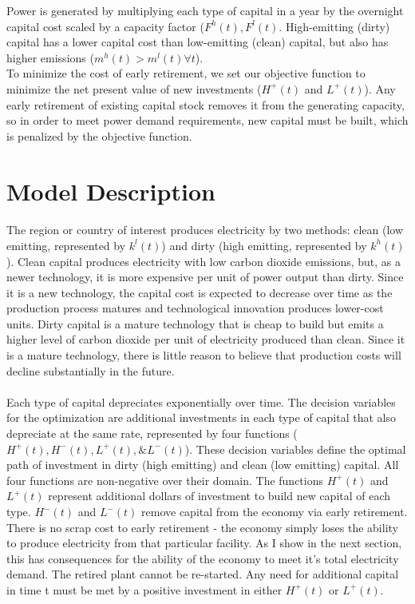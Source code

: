 \documentclass[singlespace]{easychithesis}
\begin{document}
Power is generated by multiplying each type of capital in a year by the overnight capital cost scaled by a capacity factor ($F^h(t), F^l(t)$. High-emitting (dirty) capital has a lower capital cost than low-emitting (clean) capital, but also has higher emissions ($m^h(t) > m^l(t) \forall t$). \\

To minimize the cost of early retirement, we set our objective function to minimize the net present value of new investments ($H^+(t)$ and $L^+(t)$). Any early retirement of existing capital stock removes it from the generating capacity, so in order to meet power demand requirements, new capital must be built, which is penalized by the objective function. 



\section{Model Description}\label{sec:ModelDesc}

\paragraph{} The region or country of interest produces electricity by two methods: clean (low emitting, represented by $k^l(t)$) and dirty (high emitting, represented by $k^h(t)$). Clean capital produces electricity with low carbon dioxide emissions, but, as a newer technology, it is more expensive per unit of power output than dirty. Since it is a new technology, the capital cost is expected to decrease over time as the production process matures and technological innovation produces lower-cost units. Dirty capital is a mature technology that is cheap to build but emits a higher level of carbon dioxide per unit of electricity produced than clean. Since it is a mature technology, there is little reason to believe that production costs will decline substantially in the future. 


\paragraph{} Each type of capital depreciates exponentially over time. The decision variables for the optimization are additional investments in each type of capital that also depreciate at the same rate, represented by four functions ($H^+(t), H^-(t), L^+(t), \& L^-(t)$). These decision variables define the optimal path of investment in dirty (high emitting) and clean (low emitting) capital. All four functions are non-negative over their domain. The functions $H^+(t)$ and $L^+(t)$ represent additional dollars of investment to build new capital of each type. $H^-(t)$ and $L^-(t)$ remove capital from the economy via early retirement. There is no scrap cost to early retirement - the economy simply loses the ability to produce electricity from that particular facility. As I show in the next section, this has consequences for the ability of the economy to meet it's total electricity demand. The retired plant cannot be re-started. Any need for additional capital in time t must be met by a positive investment in either $H^+(t)$ or $L^+(t)$. 
\end{document}
